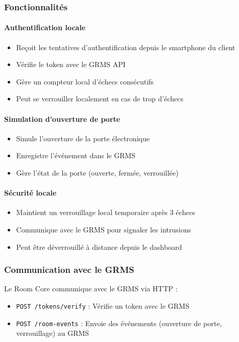 \documentclass[11pt,a4paper]{article}
\begin{document}
\subsubsection{Fonctionnalités}

\paragraph{Authentification locale}
\begin{itemize}
    \item Reçoit les tentatives d'authentification depuis le smartphone du client
    \item Vérifie le token avec le GRMS API
    \item Gère un compteur local d'échecs consécutifs
    \item Peut se verrouiller localement en cas de trop d'échecs
\end{itemize}

\paragraph{Simulation d'ouverture de porte}
\begin{itemize}
    \item Simule l'ouverture de la porte électronique
    \item Enregistre l'événement dans le GRMS
    \item Gère l'état de la porte (ouverte, fermée, verrouillée)
\end{itemize}

\paragraph{Sécurité locale}
\begin{itemize}
    \item Maintient un verrouillage local temporaire après 3 échecs
    \item Communique avec le GRMS pour signaler les intrusions
    \item Peut être déverrouillé à distance depuis le dashboard
\end{itemize}

\subsubsection{Communication avec le GRMS}

Le Room Core communique avec le GRMS via HTTP :
\begin{itemize}
    \item \texttt{POST /tokens/verify} : Vérifie un token avec le GRMS
    \item \texttt{POST /room-events} : Envoie des événements (ouverture de porte, verrouillage) au GRMS
\end{itemize}
\end{document}

